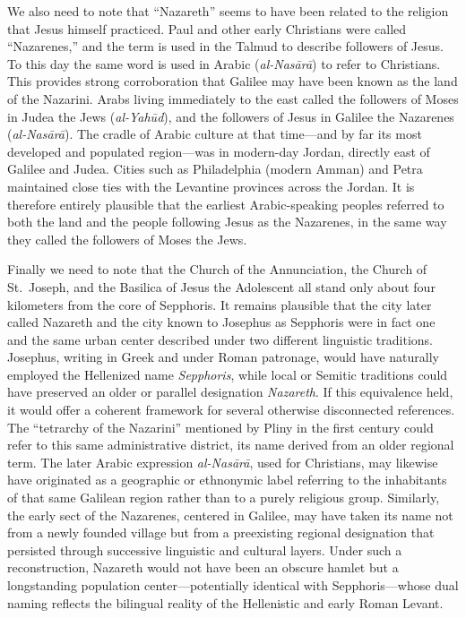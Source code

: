 We also need to note that ``Nazareth'' seems to have been related to the religion that Jesus himself practiced.
Paul and other early Christians were called ``Nazarenes,'' and the term is used in the Talmud to describe followers of Jesus.
To this day the same word is used in Arabic (\textit{al-Nasārā}) to refer to Christians.
This provides strong corroboration that Galilee may have been known as the land of the Nazarini.
Arabs living immediately to the east called the followers of Moses in Judea the Jews (\textit{al-Yahūd}), and the followers of Jesus in Galilee the Nazarenes (\textit{al-Nasārā}).
The cradle of Arabic culture at that time---and by far its most developed and populated region---was in modern-day Jordan, directly east of Galilee and Judea.
Cities such as Philadelphia (modern Amman) and Petra maintained close ties with the Levantine provinces across the Jordan.
It is therefore entirely plausible that the earliest Arabic-speaking peoples referred to both the land and the people following Jesus as the Nazarenes, in the same way they called the followers of Moses the Jews.

Finally we need to note that the Church of the Annunciation, the Church of St.~Joseph, and the Basilica of Jesus the Adolescent all stand only about four kilometers from the core of Sepphoris.
It remains plausible that the city later called Nazareth and the city known to Josephus as Sepphoris were in fact one and the same urban center described under two different linguistic traditions.
Josephus, writing in Greek and under Roman patronage, would have naturally employed the Hellenized name \textit{Sepphoris}, while local or Semitic traditions could have preserved an older or parallel designation \textit{Nazareth}.
If this equivalence held, it would offer a coherent framework for several otherwise disconnected references.
The “tetrarchy of the Nazarini” mentioned by Pliny in the first century could refer to this same administrative district, its name derived from an older regional term.
The later Arabic expression \textit{al-Nasārā}, used for Christians, may likewise have originated as a geographic or ethnonymic label referring to the inhabitants of that same Galilean region rather than to a purely religious group.
Similarly, the early sect of the Nazarenes, centered in Galilee, may have taken its name not from a newly founded village but from a preexisting regional designation that persisted through successive linguistic and cultural layers.
Under such a reconstruction, Nazareth would not have been an obscure hamlet but a longstanding population center---potentially identical with Sepphoris---whose dual naming reflects the bilingual reality of the Hellenistic and early Roman Levant.

